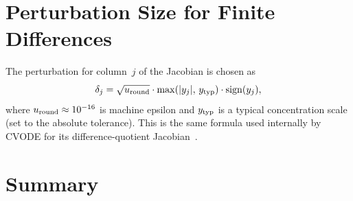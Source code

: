 \documentclass[11pt]{article}
\begin{document}
\section{Perturbation Size for Finite Differences}
\label{sec:perturbation}

The perturbation for column~$j$ of the Jacobian is chosen as
\begin{equation}
  \delta_{j} = \sqrt{u_{\rm round}} \cdot \max(|y_{j}|, \, y_{\rm typ})
  \cdot \operatorname{sign}(y_{j}),
  \label{eq:delta}
\end{equation}
where $u_{\rm round} \approx 10^{-16}$ is machine epsilon and
$y_{\rm typ}$ is a typical concentration scale (set to the absolute
tolerance). This is the same formula used internally by CVODE for its
difference-quotient Jacobian~\cite{HindmarshEtAl2005}.

\section{Summary}
\label{sec:summary}
\end{document}
